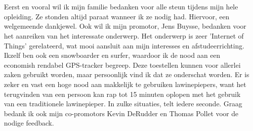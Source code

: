 
\chapter*{}
\label{ch:voorwoord}
Eerst en vooral wil ik mijn familie bedanken voor alle steun tijdens mijn hele opleiding. Ze stonden altijd paraat wanneer ik ze nodig had. Hiervoor, een welgemeende dankjewel.
\newline
\newline
Ook wil ik mijn promotor, Jens Buysse, bedanken voor het aanreiken van het interessate onderwerp. Het onderwerp is zeer 'Internet of Things' gerelateerd, wat mooi aansluit aan mijn interesses en afstudeerrichting. Ikzelf ben ook een snowboarder en surfer, waardoor ik de nood aan een economish rendabel GPS-tracker begreep. Deze toestellen kunnen voor allerlei zaken gebruikt worden, maar persoonlijk vind ik dat ze onderschat worden. Er is zeker en vast een hoge nood aan makkelijk te gebruiken lawinepiepers, want het terugvinden van een persoon kan rap tot 15 minuten oplopen met het gebruik van een traditionele lawinepieper. In zulke situaties, telt iedere seconde.
\newline
\newline
Graag bedank ik ook mijn co-promotors Kevin DeRudder en Thomas Pollet voor de nodige feedback. 